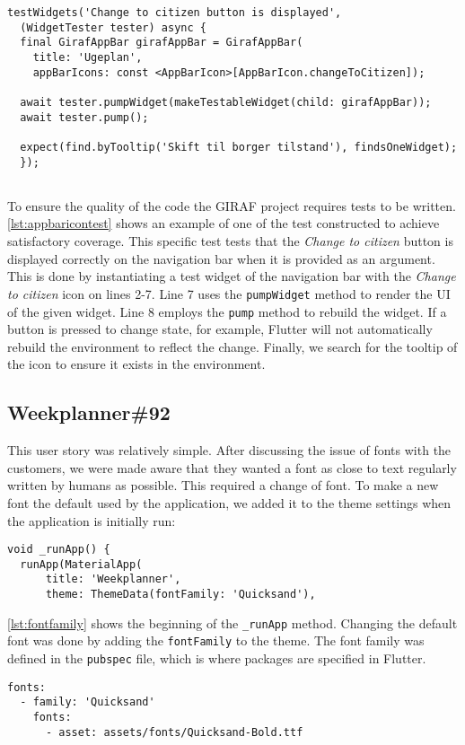 \begin{lstlisting}[caption={Testing the appbar with certain icons},label={lst:appbaricontest},language={[Sharp]C}]
  testWidgets('Change to citizen button is displayed',
  (WidgetTester tester) async {
  final GirafAppBar girafAppBar = GirafAppBar(
    title: 'Ugeplan',
    appBarIcons: const <AppBarIcon>[AppBarIcon.changeToCitizen]);
  
  await tester.pumpWidget(makeTestableWidget(child: girafAppBar));
  await tester.pump();
  
  expect(find.byTooltip('Skift til borger tilstand'), findsOneWidget);
  });
  
\end{lstlisting}
To ensure the quality of the code the GIRAF project requires tests to be written.
\autoref{lst:appbaricontest} shows an example of one of the test constructed to achieve satisfactory coverage.
This specific test tests that the \textit{Change to citizen} button is displayed correctly on the navigation bar when it is provided as an argument.
This is done by instantiating a test widget of the navigation bar with the \textit{Change to citizen} icon on lines 2-7.
Line 7 uses the \texttt{pumpWidget} method to render the UI of the given widget.
Line 8 employs the \texttt{pump} method to rebuild the widget.
If a button is pressed to change state, for example, Flutter will not automatically rebuild the environment to reflect the change.
Finally, we search for the tooltip of the icon to ensure it exists in the environment.

\subsection{Weekplanner\#92}
This user story was relatively simple.
After discussing the issue of fonts with the customers, we were made aware that they wanted a font as close to text regularly written by humans as possible.
This required a change of font.
To make a new font the default used by the application, we added it to the theme settings when the application is initially run:

\begin{lstlisting}[caption={An excerpt of the run method},label={lst:fontfamily},language={[Sharp]C}]
  void _runApp() {
  runApp(MaterialApp(
      title: 'Weekplanner',
      theme: ThemeData(fontFamily: 'Quicksand'),
\end{lstlisting}
\autoref{lst:fontfamily} shows the beginning of the \texttt{\_runApp} method.
Changing the default font was done by adding the \texttt{fontFamily} to the theme.
The font family was defined in the \texttt{pubspec} file, which is where packages are specified in Flutter.
\begin{lstlisting}[caption={An excerpt of the pubspec file. Multiple assets are in the file for different styles, such as regular font.},label={lst:fontpubspec},language={[Sharp]C}]
  fonts:
  - family: 'Quicksand'
    fonts:
      - asset: assets/fonts/Quicksand-Bold.ttf
\end{lstlisting}

